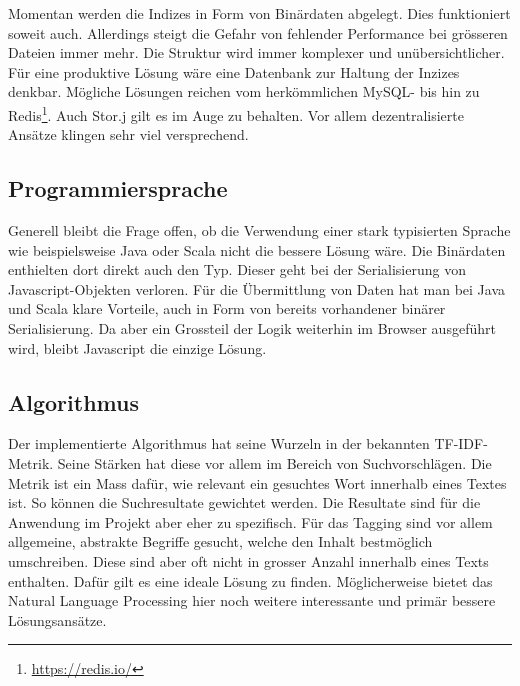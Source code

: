 Momentan werden die Indizes in Form von Binärdaten abgelegt. Dies funktioniert soweit auch. Allerdings steigt die Gefahr von fehlender Performance bei grösseren Dateien immer mehr. Die Struktur wird immer komplexer und unübersichtlicher. Für eine produktive Lösung wäre eine Datenbank zur Haltung der Inzizes denkbar. Mögliche Lös\-ung\-en reichen vom herkömmlichen MySQL- bis hin zu Redis\footnote{\url{https://redis.io/}}. Auch Stor.j gilt es im Auge zu behalten. Vor allem dezentralisierte Ansätze klingen sehr viel versprechend.

\subsection{Programmiersprache}

Generell bleibt die Frage offen, ob die Verwendung einer stark typisierten Sprache wie beispielsweise Java oder Scala nicht die bessere Lösung wäre. Die Binärdaten enthielten dort direkt auch den Typ. Dieser geht bei der Serialisierung von Javascript-Objekten verloren. Für die Übermittlung von Daten hat man bei Java und Scala klare Vorteile, auch in Form von bereits vorhandener binärer Serialisierung. Da aber ein Grossteil der Logik weiterhin im Browser ausgeführt wird, bleibt Javascript die einzige Lösung.

\subsection{Algorithmus}

Der implementierte Algorithmus hat seine Wurzeln in der bekannten TF-IDF-Metrik. Seine Stärken hat diese vor allem im Bereich von Suchvorschlägen. Die Metrik ist ein Mass dafür, wie relevant ein gesuchtes Wort innerhalb eines Textes ist. So können die Suchresultate gewichtet werden. Die Resultate sind für die Anwendung im Projekt aber eher zu spezifisch. Für das Tagging sind vor allem allgemeine, abstrakte Begriffe gesucht, welche den Inhalt bestmöglich umschreiben. Diese sind aber oft nicht in grosser Anzahl innerhalb eines Texts enthalten. Dafür gilt es eine ideale Lösung zu finden. Möglicherweise bietet das Natural Language Processing hier noch weitere interessante und primär bessere Lösungsansätze.

